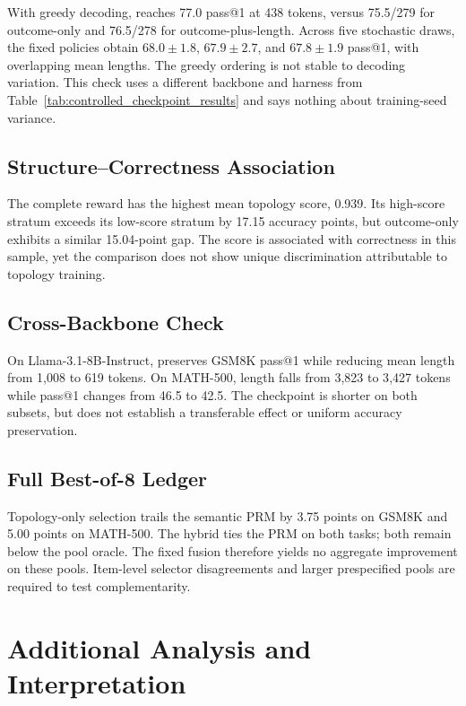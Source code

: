 With greedy decoding, \method reaches 77.0 pass@1 at 438 tokens, versus 75.5/279 for outcome-only and 76.5/278 for outcome-plus-length. Across five stochastic draws, the fixed policies obtain $68.0\pm1.8$, $67.9\pm2.7$, and $67.8\pm1.9$ pass@1, with overlapping mean lengths. The greedy ordering is not stable to decoding variation. This check uses a different backbone and harness from Table~\ref{tab:controlled_checkpoint_results} and says nothing about training-seed variance.

\subsection{Structure--Correctness Association}


The complete reward has the highest mean topology score, 0.939. Its high-score stratum exceeds its low-score stratum by 17.15 accuracy points, but outcome-only exhibits a similar 15.04-point gap. The score is associated with correctness in this sample, yet the comparison does not show unique discrimination attributable to topology training.

\subsection{Cross-Backbone Check}


On Llama-3.1-8B-Instruct, \method preserves GSM8K pass@1 while reducing mean length from 1{,}008 to 619 tokens. On MATH-500, length falls from 3{,}823 to 3{,}427 tokens while pass@1 changes from 46.5 to 42.5. The checkpoint is shorter on both subsets, but does not establish a transferable effect or uniform accuracy preservation.

\subsection{Full Best-of-8 Ledger}


Topology-only selection trails the semantic PRM by 3.75 points on GSM8K and 5.00 points on MATH-500. The hybrid ties the PRM on both tasks; both remain below the pool oracle. The fixed fusion therefore yields no aggregate improvement on these pools. Item-level selector disagreements and larger prespecified pools are required to test complementarity.

\section{Additional Analysis and Interpretation}
\label{app:additional_discussion}


